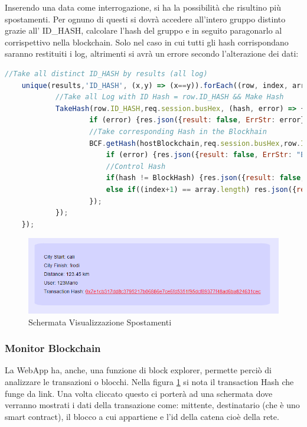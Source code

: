 \documentclass[11pt,a4paper,titlepage]{report}
\begin{document}
Inserendo una data come interrogazione, si ha la possibilità che risultino più spostamenti. Per ognuno di questi si dovrà accedere all'intero gruppo distinto grazie all' ID\_HASH, calcolare l'hash del gruppo e in seguito paragonarlo al corrispettivo nella blockchain. Solo nel caso in cui tutti gli hash corrispondano saranno restituiti i log, altrimenti si avrà un errore secondo l'alterazione dei dati:
\begin{lstlisting}[language=JavaScript]
	//Take all distinct ID_HASH by results (all log)
	unique(results,'ID_HASH', (x,y) => (x==y)).forEach((row, index, array) => {
  			//Take all Log with ID Hash = row.ID_HASH && Make Hash
  			TakeHash(row.ID_HASH,req.session.busHex, (hash, error) => {
  					if (error) {res.json({result: false, ErrStr: error});return;}
  					//Take corresponding Hash in the Blockhain
					BCF.getHash(hostBlockchain,req.session.busHex,row.ID_HASH, (error, BlockHash) => {
						if (error) {res.json({result: false, ErrStr: "Errore nel contattare la blockchain"});return;}
						//Control Hash
  						if(hash != BlockHash) {res.json({result: false, ErrStr: "I dati Sono stati alterati"});return;}
  						else if((index+1) == array.length) res.json({result: true, ErrStr: "", LOG: results});
					});
  			});
  	});
\end{lstlisting}

\begin{figure}[h]
	\includegraphics[width=\textwidth]{Log_Print}
	\centering
	\caption{Schermata Visualizzazione Spostamenti}
	\label{fig:Log_Print}
\end{figure}

\subsubsection{Monitor Blockchain}
La WebApp ha, anche, una funzione di block explorer, permette perciò di analizzare le transazioni o blocchi. Nella figura  \ref{fig:Log_Print} si nota il transaction Hash che funge da link. Una volta cliccato questo ci porterà ad una schermata dove verranno mostrati i dati della transazione come: mittente, destinatario (che è uno smart contract), il blocco a cui appartiene e l'id della catena cioè della rete.
\end{document}
